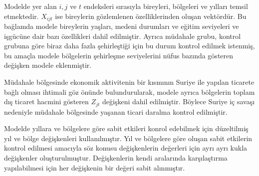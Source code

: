 \documentclass{article}
\begin{document}
\begin{justify}
    Modelde yer alan $i,j$ ve $t$ endeksleri sırasıyla bireyleri, bölgeleri ve yılları temsil etmektedir.
    $X_{ijt}$ ise bireylerin gözlemlenen özelliklerinden oluşan vektördür. Bu bağlamda modele bireylerin
    yaşları, medeni durumları ve eğitim seviyeleri ve işgücüne dair bazı özellikleri dahil edilmiştir. 
    Ayrıca müdahale grubu, kontrol grubuna göre biraz daha fazla şehirleştiği için bu durum kontrol edilmek 
    istenmiş, bu amaçla modele bölgelerin şehirleşme seviyelerini nüfus bazında gösteren değişken modele eklenmiştir.

    Müdahale bölgesinde ekonomik aktivitenin bir kısmının Suriye ile yapılan ticarete bağlı olması ihtimali 
    göz önünde bulundurularak, modele ayrıca bölgelerin toplam dış ticaret hacmini gösteren $Z_{jt}$
    değişkeni dahil edilmiştir. Böylece Suriye iç savaşı nedeniyle müdahale bölgesinde yaşanan ticari daralma
    kontrol edilmiştir. 

    Modelde yıllara ve bölgelere göre sabit etkileri konrol edebilmek için düzeltilmiş yıl ve bölge 
    değişkenleri kullanılmıştır. Yıl ve bölgelere göre oluşan sabit etkilerin kontrol edilmesi amacıyla
    söz konusu değişkenlerin değerleri için ayrı ayrı kukla değişkenler oluşturulmuştur. Değişkenlerin kendi
    aralarında karşılaştırma yapılabilmesi için her değişkenin bir değeri sabit alınmıştır. 

    \end{justify}
\end{document}
